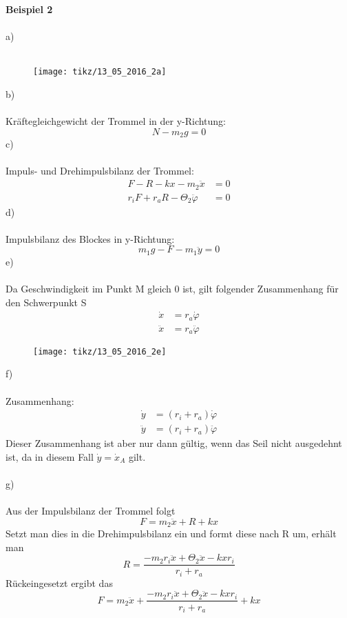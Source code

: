 \newpage
\noindent
\textbf{Beispiel 2}\\ \\
a)\\ \\
\begin{figure}[h]
	\centering
	\texttt{[image: tikz/13\_05\_2016\_2a]}
\end{figure}
\newline
b)\\ \\
Kräftegleichgewicht der Trommel in der y-Richtung:
\[
	N - m_2g = 0
\]
c)\\ \\
Impuls- und Drehimpulsbilanz der Trommel:
\begin{align*}
	F - R - kx - m_2\ddot{x} &= 0 \\
	r_iF + r_aR - \Theta_2\ddot{\varphi} &= 0
\end{align*}
d) \\ \\
Impulsbilanz des Blockes in y-Richtung:
\[
	m_1g - F - m_1\ddot{y} = 0
\]
e)\\ \\
Da Geschwindigkeit im Punkt M gleich $0$ ist, gilt folgender Zusammenhang für den Schwerpunkt S
\begin{align*}
	\dot{x} &= r_a\dot{\varphi} \\
	\ddot{x} &= r_a\ddot{\varphi}
\end{align*}
\begin{figure}[h]
	\centering
	\texttt{[image: tikz/13\_05\_2016\_2e]}
\end{figure}
\newpage
\noindent
f)\\ \\
Zusammenhang:
\begin{align*}
	\dot{y} &= (r_i + r_a)\dot{\varphi} \\
	\ddot{y} &= (r_i + r_a)\ddot{\varphi}
\end{align*}
Dieser Zusammenhang ist aber nur dann gültig, wenn das Seil nicht ausgedehnt ist, da in diesem Fall $\dot{y} = \dot{x}_A$ gilt.\\ \\
g)\\ \\
Aus der Impulsbilanz der Trommel folgt
\[
	F = m_2\ddot{x} + R + kx
\]
Setzt man dies in die Drehimpulsbilanz ein und formt diese nach R um, erhält man
\[
	R = \frac{-m_2r_i\ddot{x} + \Theta_2\ddot{x} - kxr_i}{r_i + r_a}
\]
Rückeingesetzt ergibt das 
\[	
	F = m_2\ddot{x} + \frac{-m_2r_i\ddot{x} + \Theta_2\ddot{x} - kxr_i}{r_i + r_a} + kx
\]
